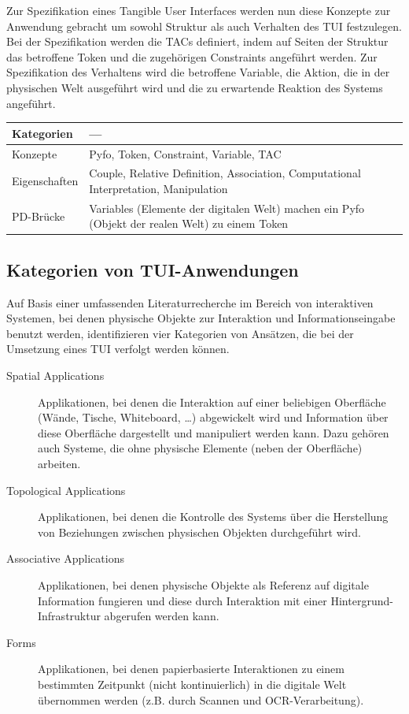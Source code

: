 Zur Spezifikation eines Tangible User Interfaces werden nun diese Konzepte zur Anwendung gebracht um sowohl Struktur als auch Verhalten des \gls{TUI} festzulegen. Bei der Spezifikation werden die \glspl{TAC} definiert, indem auf Seiten der Struktur das betroffene Token und die zugehörigen Constraints angeführt werden. Zur Spezifikation des Verhaltens wird die betroffene Variable, die Aktion, die in der physischen Welt ausgeführt wird und die zu erwartende Reaktion des Systems angeführt.

\begin{tabular}{| p{3cm} | p{10cm} |}
  \hline
  Kategorien & --- \\ \hline
  Konzepte & Pyfo, Token, Constraint, Variable, \gls{TAC} \\ \hline
  Eigenschaften & Couple, Relative Definition, Association, Computational Interpretation, Manipulation \\ \hline
  PD-Brücke & Variables (Elemente der digitalen Welt) machen ein Pyfo (Objekt der realen Welt) zu einem Token \\ \hline
\end{tabular} 


\subsection{Kategorien von TUI-Anwendungen} %
\label{sub:kategorien_von_tui_anwendungen}

Auf Basis einer umfassenden Literaturrecherche im Bereich von interaktiven Systemen, bei denen physische Objekte zur Interaktion und Informationseingabe benutzt werden, identifizieren \citet{Klemmer04} vier Kategorien von Ansätzen, die bei der Umsetzung eines \gls{TUI} verfolgt werden können. 

\begin{description}
	\item[Spatial Applications] Applikationen, bei denen die Interaktion auf einer beliebigen Oberfläche (Wände, Tische, Whiteboard, \ldots) abgewickelt wird und Information über diese Oberfläche dargestellt und manipuliert werden kann. Dazu gehören auch Systeme, die ohne physische Elemente (neben der Oberfläche) arbeiten.
	\item[Topological Applications] Applikationen, bei denen die Kontrolle des Systems über die Herstellung von Beziehungen zwischen physischen Objekten durchgeführt wird.
	\item[Associative Applications] Applikationen, bei denen physische Objekte als Referenz auf digitale Information fungieren und diese durch Interaktion mit einer Hintergrund-Infrastruktur abgerufen werden kann.
	\item[Forms] Applikationen, bei denen papierbasierte Interaktionen zu einem bestimmten Zeitpunkt (nicht kontinuierlich) in die digitale Welt übernommen werden (z.B. durch Scannen und \gls{OCR}-Verarbeitung).
\end{description}

